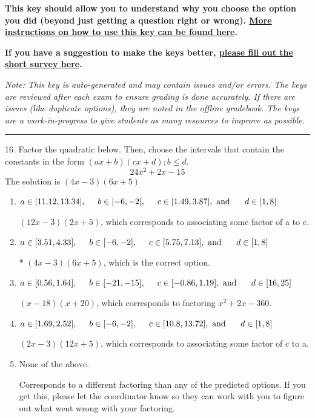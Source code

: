\documentclass{extbook}[14pt]
\begin{document}
\textbf{This key should allow you to understand why you choose the option you did (beyond just getting a question right or wrong). \href{https://xronos.clas.ufl.edu/mac1105spring2020/courseDescriptionAndMisc/Exams/LearningFromResults}{More instructions on how to use this key can be found here}.}

\textbf{If you have a suggestion to make the keys better, \href{https://forms.gle/CZkbZmPbC9XALEE88}{please fill out the short survey here}.}

\textit{Note: This key is auto-generated and may contain issues and/or errors. The keys are reviewed after each exam to ensure grading is done accurately. If there are issues (like duplicate options), they are noted in the offline gradebook. The keys are a work-in-progress to give students as many resources to improve as possible.}

\rule{\textwidth}{0.4pt}

16. Factor the quadratic below. Then, choose the intervals that contain the constants in the form $(ax+b)(cx+d); b \leq d.$
\[ 24x^{2} +2 x -15 \] 
The solution is $ (4x -3)(6x + 5) $ 

\begin{enumerate}[label=\Alph*.] 
\item $ a \in [11.12, 13.34], \hspace*{5mm} b \in [-6, -2], \hspace*{5mm} c \in [1.49, 3.87], \text{ and } \hspace*{5mm} d \in [1, 8] $ 

  $(12x -3)(2x + 5)$, which corresponds to associating some factor of a to c. 
\item $ a \in [3.51, 4.33], \hspace*{5mm} b \in [-6, -2], \hspace*{5mm} c \in [5.75, 7.13], \text{ and } \hspace*{5mm} d \in [1, 8] $ 

 * $(4x -3)(6x + 5)$, which is the correct option. 
\item $ a \in [0.56, 1.64], \hspace*{5mm} b \in [-21, -15], \hspace*{5mm} c \in [-0.86, 1.19], \text{ and } \hspace*{5mm} d \in [16, 25] $ 

  $(x -18)(x + 20)$, which corresponds to factoring $x^{2} +2 x -360$. 
\item $ a \in [1.69, 2.52], \hspace*{5mm} b \in [-6, -2], \hspace*{5mm} c \in [10.8, 13.72], \text{ and } \hspace*{5mm} d \in [1, 8] $ 

  $(2x -3)(12x + 5)$, which corresponds to associating some factor of c to a. 
\item $ \text{None of the above.} $ 

  Corresponds to a different factoring than any of the predicted options. If you get this, please let the coordinator know so they can work with you to figure out what went wrong with your factoring. 
\end{enumerate} 
 
\end{document}
